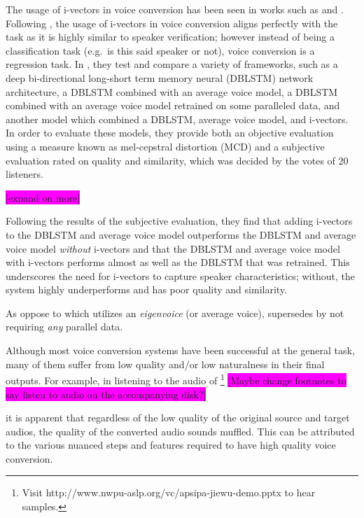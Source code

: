 \documentclass
[
    a4paper,
    twoside,
    12pt,
]
{report}
\begin{document}
The usage of i-vectors in voice conversion has been seen in works such
as \textcite{wu2016} and \textcite{kinnunen2017}. Following
\textcite{kinnunen2017}, the usage of i-vectors in voice conversion
aligns perfectly with the task as it is highly similar to speaker
verification; however instead of being a classification task (e.g.~is
this said speaker or not), voice conversion is a regression task. In
\textcite{wu2016}, they test and compare a variety of frameworks, such
as a deep bi-directional long-short term memory neural (DBLSTM) network
architecture, a DBLSTM combined with an average voice model, a DBLSTM
combined with an average voice model retrained on some paralleled data,
and another model which combined a DBLSTM, average voice model, and
i-vectors. In order to evaluate these models, they provide both an
objective evaluation using a measure known as mel-cepstral distortion
(MCD) and a subjective evaluation rated on quality and similarity, which
was decided by the votes of 20 listeners.

\colorbox{magenta}{[expand on \textcite{wu2016} more]}

Following the results of the subjective evaluation, they find that
adding i-vectors to the DBLSTM and average voice model outperforms the
DBLSTM and average voice model \emph{without} i-vectors and that the
DBLSTM and average voice model with i-vectors performs almost as well as
the DBLSTM that was retrained. This underscores the need for i-vectors
to capture speaker characteristics; without, the system highly
underperforms and has poor quality and similarity.

As oppose to \textcite{wu2016} which utilizes an \emph{eigenvoice} (or
average voice), \textcite{kinnunen2017} supersedes \textcite{wu2016} by
not requiring \emph{any} parallel data.

Although most voice conversion systems have been successful at the
general task, many of them suffer from low quality and/or low
naturalness in their final outputs. For example, in listening to the
audio of
\textcite{wu2016}\footnote{Visit http://www.nwpu-aslp.org/vc/apsipa-jiewu-demo.pptx to hear samples.}
\colorbox{magenta}{[Maybe change footnotes to say listen to audio on the accompanying disk?]}

it is apparent that regardless of the low quality of the original source
and target audios, the quality of the converted audio sounds muffled.
This can be attributed to the various nuanced steps and features
required to have high quality voice conversion.
\end{document}

